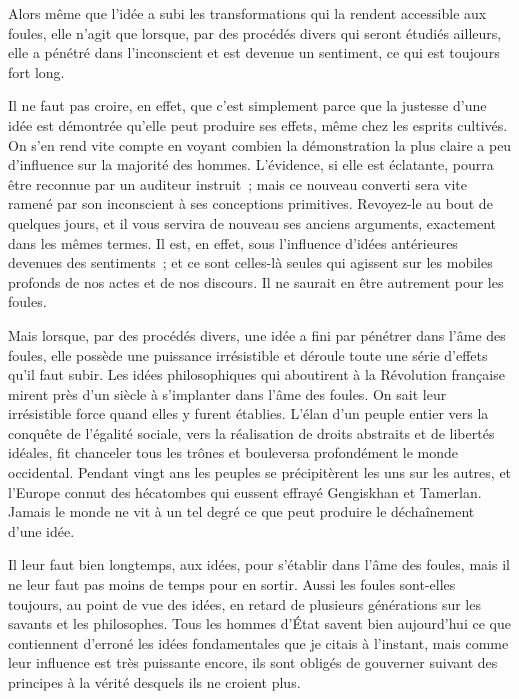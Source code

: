 \documentclass[french,twoside]{book} %
\begin{document}
Alors même que l’idée a subi les transformations qui la rendent accessible aux foules, elle n’agit que lorsque, par des procédés divers qui seront étudiés ailleurs, elle a pénétré dans l’inconscient et est devenue un sentiment, ce qui est toujours fort long.\par
Il ne faut pas croire, en effet, que c’est simplement parce que la justesse d’une idée est démontrée qu’elle peut produire ses effets, même chez les esprits cultivés. On s’en rend vite compte en voyant combien la démonstration la plus claire a peu d’influence sur la majorité des hommes. L’évidence, si elle est éclatante, pourra être reconnue par un auditeur instruit ; mais ce nouveau converti sera vite ramené par son inconscient à ses conceptions primitives. Revoyez-le au bout de quel­ques jours, et il vous servira de nouveau ses anciens arguments, exactement dans les mêmes termes. Il est, en effet, sous l’influence d’idées antérieures devenues des sentiments ; et ce sont celles-là seules qui agissent sur les mobiles profonds de nos actes et de nos discours. Il ne saurait en être autrement pour les foules.\par
Mais lorsque, par des procédés divers, une idée a fini par pénétrer dans l’âme des foules, elle possède une puissance irrésistible et déroule toute une série d’effets qu’il faut subir. Les idées philosophiques qui aboutirent à la Révolution française mirent près d’un siècle à s’implanter dans l’âme des foules. On sait leur irrésistible force quand elles y furent établies. L’élan d’un peuple entier vers la conquête de l’égalité sociale, vers la réalisation de droits abstraits et de libertés idéales, fit chanceler tous les trônes et bouleversa profondément le monde occidental. Pendant vingt ans les peuples se précipitèrent les uns sur les autres, et l’Europe connut des hécatombes qui eussent effrayé Gengiskhan et Tamerlan. Jamais le monde ne vit à un tel degré ce que peut produire le déchaînement d’une idée.\par
Il leur faut bien longtemps, aux idées, pour s’établir dans l’âme des foules, mais il ne leur faut pas moins de temps pour en sortir. Aussi les foules sont-elles toujours, au point de vue des idées, en retard de plusieurs générations sur les savants et les philo­sophes. Tous les hommes d’État savent bien aujourd’hui ce que contiennent d’erroné les idées fondamentales que je citais à l’instant, mais comme leur influence est très puissante encore, ils sont obligés de gouverner suivant des principes à la vérité desquels ils ne croient plus.
\end{document}
